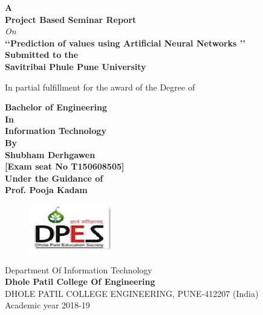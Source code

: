 \documentclass[12pt,times,a4paper]{report}
\begin{document}
\begin{titlepage}
\newpage
{}
\pagestyle{empty}

\thispagestyle{empty}
\thisfancypage{%
  \setlength{\fboxrule}{2pt}\doublebox}{}

\begin{center}
\vspace*{0.2in}
{\fontsize{18}{16} \bf {A}}\\
{\fontsize{18}{16} \bf {Project Based Seminar Report}}\\
{\fontsize{18}{16} \it {On }}\\
\vspace*{0.2in}
{\fontsize{18}{14} \bf {\lq\lq  Prediction of values using Artificial Neural Networks \rq\rq}}\\
\vspace*{0.2in}
{\fontsize{12}{16} \bf  Submitted to the}\\
{\fontsize{12}{16} \bf Savitribai Phule Pune University
}
\begin{normalsize}
\begin{center}
In partial fulfillment for the award of the Degree of
\end{center}
\end{normalsize}

{\fontsize{14}{12} \bf  Bachelor of Engineering }\\
{\fontsize{14}{12} \bf  In}
\\{\fontsize{14}{12} \bf  Information Technology }\\
{\fontsize{12}{16} \bf   By}\\
\vspace*{0.1in}
{\fontsize{14}{12} \bf Shubham Derhgawen }\\
{\fontsize{12}{8} \bf [Exam seat No T150608505] }\\

\vspace*{0.2in}
{\fontsize{12}{16} \bf Under the Guidance of }\\
\vspace*{0.1in}
{\fontsize{14}{12} \bf Prof. Pooja Kadam}\\
\begin{figure}[h]
\centerline{\includegraphics[scale=0.8]{logo1.jpg}}
\end{figure}

{ \fontsize{14}{12}  {Department Of Information Technology}}\\
{ \fontsize{14}{12} \bf {Dhole Patil  College Of Engineering}}\\
{ \fontsize{14}{12}  {DHOLE PATIL COLLEGE ENGINEERING, PUNE-412207 (India)}}\\

Academic year 2018-19

\end{center}
\end{titlepage}
\end{document}
